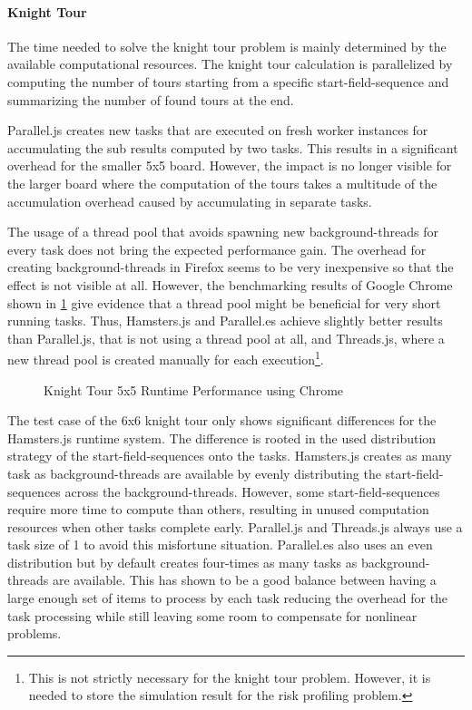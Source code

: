\begin{figure*}
		
	\caption{Runtime Performance of Parallelization Problems Relative to Synchronously Execution}
	\label{fig:runtime-performance}
\end{figure*}


\paragraph{Knight Tour} The time needed to solve the knight tour problem is mainly determined by the available computational resources. The knight tour calculation is parallelized by computing the number of tours starting from a specific start-field-sequence and summarizing the  number of found tours at the end. 

Parallel.js creates new tasks that are executed on fresh worker instances for accumulating the sub results computed by two tasks. This results in a significant overhead for the smaller 5x5 board. However, the impact is no longer visible for the larger board where the computation of the tours takes a multitude of the accumulation overhead caused by accumulating in separate tasks.

The usage of a thread pool that avoids spawning new background-threads for every task does not bring the expected performance gain. The overhead for creating background-threads in Firefox seems to be very inexpensive so that the effect is not visible at all. However, the benchmarking results of Google Chrome shown in \cref{fig:runtime-performance-chrome} give evidence that a thread pool might be beneficial for very short running tasks. Thus, Hamsters.js and Parallel.es achieve slightly better results than Parallel.js, that is not using a thread pool at all, and Threads.js, where a new thread pool is created manually for each execution\footnote{This is not strictly necessary for the knight tour problem. However, it is needed to store the simulation result for the risk profiling problem.}. 

\begin{figure}
	\centering
	
	\caption{Knight Tour 5x5 Runtime Performance using Chrome}
	\label{fig:runtime-performance-chrome}
\end{figure}

The test case of the 6x6 knight tour only shows significant differences for the Hamsters.js runtime system. The difference is rooted in the used distribution strategy of the start-field-sequences onto the tasks. Hamsters.js creates as many task as background-threads are available by evenly distributing the start-field-sequences across the background-threads. However, some start-field-sequences require more time to compute than others, resulting in unused computation resources when other tasks complete early. Parallel.js and Threads.js always use a task size of 1 to avoid this misfortune situation. Parallel.es also uses an even distribution but by default creates four-times as many tasks as background-threads are available. This has shown to be a good balance between having a large enough set of items to process by each task reducing the overhead for the task processing while still leaving some room to compensate for nonlinear problems. 

